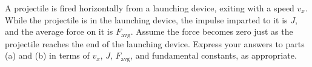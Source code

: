 \documentclass{../../oss-apphys-exam}
\begin{document}
\begin{questions}
%  
%    
%    
%    
%    
%    

  \question A projectile is fired horizontally from a launching device, exiting
  with a speed $v_x$. While the projectile is in the launching device, the
  impulse imparted to it is $J$, and the average force on it is $F_\text{avg}$.
  Assume the force becomes zero just as the projectile reaches the end of the
  launching device. Express your answers to parts (a) and (b) in
  terms of $v_x$, $J$, $F_\text{avg}$, and fundamental constants, as
  appropriate.
  \begin{parts}

\end{parts}
\end{questions}
\end{document}
